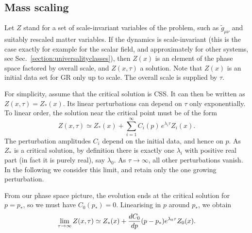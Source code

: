 \documentclass{article}
\begin{document}

\subsection{Mass scaling}
\label{section:scaling}

Let $Z$ stand for a set of scale-invariant variables of the problem,
such as $\tilde g_{\mu\nu}$ and suitably rescaled matter variables. If
the dynamics is scale-invariant (this is the case exactly for example
for the scalar field, and approximately for other systems, see
Sec.~\ref{section:universalityclasses}), then $Z(x)$ is an element of
the phase space factored by overall scale, and $Z(x,\tau)$ a
solution. Note that $Z(x)$ is an initial data set for GR only up to
scale. The overall scale is supplied by $\tau$.

For simplicity, assume that the critical solution is CSS. It can then
be written as $Z(x,\tau)=Z_*(x)$. Its linear perturbations can depend
on $\tau$ only exponentially. To linear order, the solution near the
critical point must be of the form
%
\begin{equation}
\label{perturbations}
  Z(x,\tau) \simeq Z_*(x) + \sum_{i=1}^\infty C_i(p) \, e^{\lambda_i
    \tau} Z_i(x).
\end{equation}
%
The perturbation amplitudes $C_i$ depend on the initial data, and
hence on $p$. As $Z_*$ is a critical solution, by definition there is
exactly one $\lambda_i$ with positive real part (in fact it is purely
real), say $\lambda_0$. As $\tau\to\infty$, all other perturbations
vanish. In the following we consider this limit, and retain only the
one growing perturbation. 

From our phase space picture, the evolution ends at the critical
solution for $p=p_*$, so we must
have $C_0(p_*)=0$. Linearising in $p$ around $p_*$, we obtain
%
\begin{equation}
  \label{echoing_region}
  \lim_{\tau\to\infty} Z(x,\tau) \simeq Z_*(x) + {dC_0\over dp} (p-p_*)
  e^{\lambda_0\tau} Z_0(x).
\end{equation}
%
\end{document}
